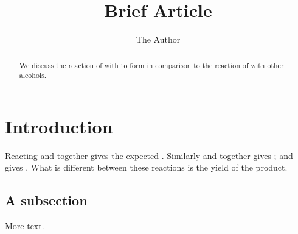 \documentclass[11pt]{article} %
\title{Brief Article}
\author{The Author}
\begin{document}
\maketitle


\begin{abstract}
We discuss the reaction of  with  to form
 in comparison to the reaction of  with 
other alcohols.
\end{abstract}

\section{Introduction}

Reacting  and  together gives the expected .
Similarly  and  together gives ;   
and  gives . What is different between these reactions is the 
yield of the product.

\subsection{A subsection}

More text.
\end{document}
